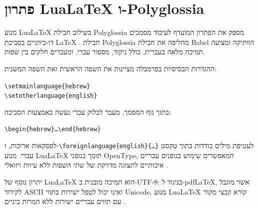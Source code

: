 \section[\texthebrew{פתרון \foreignlanguage{english}{LuaLaTeX} ו-\foreignlanguage{english}{Polyglossia}}]{\texthebrew{פתרון \foreignlanguage{english}{LuaLaTeX} ו-\foreignlanguage{english}{Polyglossia}}\mbox{\setLTR\enspace\thesection}}
\label{sec:bidi-solution}

\begin{hebrew}
מנוע \foreignlanguage{english}{LuaLaTeX} בשילוב חבילת
\foreignlanguage{english}{Polyglossia}
מספק את הפתרון המועדף לעיבוד מסמכים דו-כיווניים בסביבת
\foreignlanguage{english}{LaTeX}
\foreignlanguage{english}{\cite{Polyglossia2023}}.
חבילת \foreignlanguage{english}{Polyglossia} מחליפה את חבילת
\foreignlanguage{english}{Babel} הוותיקה ומציעה תמיכה מלאה בעברית,
כולל ניקוד, מספור עברי, ומעברים חלקים בין שפות.

ההגדרות הבסיסיות בפרמבלה מציינות את השפה הראשית ואת השפה המשנית:

\foreignlanguage{english}{\texttt{\textbackslash setmainlanguage\{hebrew\}}}\\[4pt]
\foreignlanguage{english}{\texttt{\textbackslash setotherlanguage\{english\}}}

בתוך גוף המסמך, מעבר לבלוק עברי נעשה באמצעות הסביבה:

\foreignlanguage{english}{\texttt{\textbackslash begin\{hebrew\}\ldots\textbackslash end\{hebrew\}}}

לפסקאות ארוכות, ו-\foreignlanguage{english}{\texttt{\textbackslash foreignlanguage\{english\}\{\ldots\}}}
לעטיפת מילים בודדות בתוך טקסט עברי.
מנוע \foreignlanguage{english}{LuaLaTeX} תומך בגופני
\foreignlanguage{english}{OpenType},
המאפשרים שימוש בגופנים עבריים איכותיים לתצוגה מדויקת של שתי השפות
ללא עיוות ויזואלי \foreignlanguage{english}{\cite{Segal2026}}.

יתרון נוסף של \foreignlanguage{english}{LuaLaTeX} הוא תמיכה מובנית ב-\foreignlanguage{english}{UTF-8}:
בניגוד ל-\foreignlanguage{english}{pdfLaTeX}, אשר מוגבל לקידוד \foreignlanguage{english}{ASCII}
ואינו יכול לטפל ישירות בתווי \foreignlanguage{english}{Unicode},
מנוע \foreignlanguage{english}{LuaLaTeX} קורא קבצי מקור עם תווים עבריים ישירות
ללא המרות ביניים \foreignlanguage{english}{\cite{Polyglossia2023}}.
\end{hebrew}

